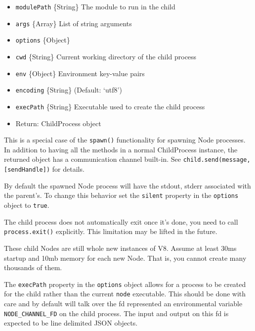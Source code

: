 \begin{itemize}
\item
  \texttt{modulePath} \{String\} The module to run in the child
\item
  \texttt{args} \{Array\} List of string arguments
\item
  \texttt{options} \{Object\}
\item
  \texttt{cwd} \{String\} Current working directory of the child process
\item
  \texttt{env} \{Object\} Environment key-value pairs
\item
  \texttt{encoding} \{String\} (Default: `utf8')
\item
  \texttt{execPath} \{String\} Executable used to create the child
  process
\item
  Return: ChildProcess object
\end{itemize}

This is a special case of the \texttt{spawn()} functionality for
spawning Node processes. In addition to having all the methods in a
normal ChildProcess instance, the returned object has a communication
channel built-in. See \texttt{child.send(message, {[}sendHandle{]})} for
details.

By default the spawned Node process will have the stdout, stderr
associated with the parent's. To change this behavior set the
\texttt{silent} property in the \texttt{options} object to
\texttt{true}.

The child process does not automatically exit once it's done, you need
to call \texttt{process.exit()} explicitly. This limitation may be
lifted in the future.

These child Nodes are still whole new instances of V8. Assume at least
30ms startup and 10mb memory for each new Node. That is, you cannot
create many thousands of them.

The \texttt{execPath} property in the \texttt{options} object allows for
a process to be created for the child rather than the current
\texttt{node} executable. This should be done with care and by default
will talk over the fd represented an environmental variable
\texttt{NODE\_CHANNEL\_FD} on the child process. The input and output on
this fd is expected to be line delimited JSON objects.

